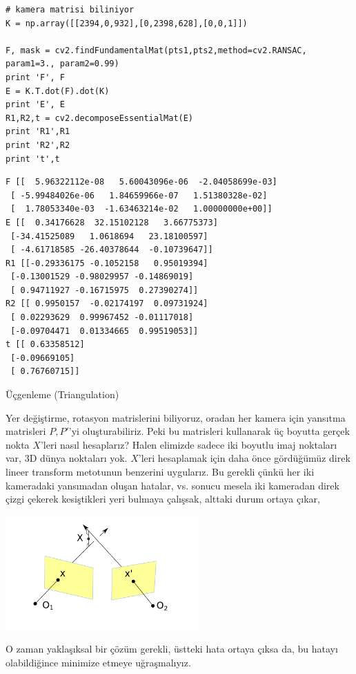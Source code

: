 \documentclass[12pt,fleqn]{article}\usepackage{../../common}
\begin{document}
\begin{verbatim}
# kamera matrisi biliniyor
K = np.array([[2394,0,932],[0,2398,628],[0,0,1]])

F, mask = cv2.findFundamentalMat(pts1,pts2,method=cv2.RANSAC, param1=3., param2=0.99)
print 'F', F
E = K.T.dot(F).dot(K)
print 'E', E
R1,R2,t = cv2.decomposeEssentialMat(E)
print 'R1',R1
print 'R2',R2
print 't',t
\end{verbatim}

\begin{verbatim}
F [[  5.96322112e-08   5.60043096e-06  -2.04058699e-03]
 [ -5.99484026e-06   1.84659966e-07   1.51380328e-02]
 [  1.78053340e-03  -1.63463214e-02   1.00000000e+00]]
E [[  0.34176628  32.15102128   3.66775373]
 [-34.41525089   1.0618694   23.18100597]
 [ -4.61718585 -26.40378644  -0.10739647]]
R1 [[-0.29336175 -0.1052158   0.95019394]
 [-0.13001529 -0.98029957 -0.14869019]
 [ 0.94711927 -0.16715975  0.27390274]]
R2 [[ 0.9950157  -0.02174197  0.09731924]
 [ 0.02293629  0.99967452 -0.01117018]
 [-0.09704471  0.01334665  0.99519053]]
t [[ 0.63358512]
 [-0.09669105]
 [ 0.76760715]]
\end{verbatim}

Üçgenleme (Triangulation) 

Yer değiştirme, rotasyon matrislerini biliyoruz, oradan her kamera için
yansıtma matrisleri $P,P'$'yi oluşturabiliriz. Peki bu matrisleri
kullanarak üç boyutta gerçek nokta $X$'leri nasıl hesaplarız?  Halen
elimizde sadece iki boyutlu imaj noktaları var, 3D dünya noktaları
yok. $X$'leri hesaplamak için daha önce gördüğümüz direk lineer transform
metotunun benzerini uygularız. Bu gerekli çünkü her iki kameradaki
yansımadan oluşan hatalar, vs. sonucu mesela iki kameradan direk çizgi
çekerek kesiştikleri yeri bulmaya çalışsak, alttaki durum ortaya çıkar,

\includegraphics[width=20em]{vision_20recons_07.png}

O zaman yaklaşıksal bir çözüm gerekli, üstteki hata ortaya çıksa da, bu
hatayı olabildiğince minimize etmeye uğraşmalıyız. 
\end{document}

